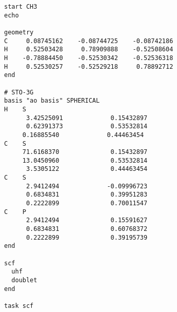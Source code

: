 \documentclass[a4paper, 12pt]{article}
\begin{document}
\begin{lstlisting}
start CH3
echo

geometry
C     0.08745162    -0.08744725    -0.08742186
H     0.52503428     0.78909888    -0.52508604
H    -0.78884450    -0.52530342    -0.52536318
H     0.52530257    -0.52529218     0.78892712
end

# STO-3G
basis "ao basis" SPHERICAL
H    S
      3.42525091             0.15432897       
      0.62391373             0.53532814       
     0.16885540             0.44463454  
C    S
     71.6168370              0.15432897       
     13.0450960              0.53532814       
      3.5305122              0.44463454       
C    S
      2.9412494             -0.09996723
      0.6834831              0.39951283    
      0.2222899              0.70011547            
C    P
      2.9412494              0.15591627       
      0.6834831              0.60768372       
      0.2222899              0.39195739    
end

scf
  uhf
  doublet
end

task scf
\end{lstlisting}

\clearpage


{}
\end{document}
